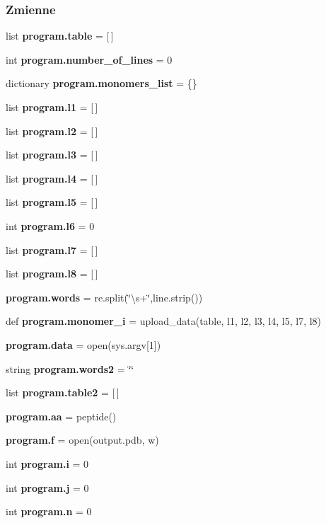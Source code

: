 \subsubsection*{Zmienne}
\begin{DoxyCompactItemize}
\item 
list \textbf{ program.\+table} = [$\,$]
\item 
int \textbf{ program.\+number\+\_\+of\+\_\+lines} = 0
\item 
dictionary \textbf{ program.\+monomers\+\_\+list} = \{\}
\item 
list \textbf{ program.\+l1} = [$\,$]
\item 
list \textbf{ program.\+l2} = [$\,$]
\item 
list \textbf{ program.\+l3} = [$\,$]
\item 
list \textbf{ program.\+l4} = [$\,$]
\item 
list \textbf{ program.\+l5} = [$\,$]
\item 
int \textbf{ program.\+l6} = 0
\item 
list \textbf{ program.\+l7} = [$\,$]
\item 
list \textbf{ program.\+l8} = [$\,$]
\item 
\textbf{ program.\+words} = re.\+split(\char`\"{}\textbackslash{}s+\char`\"{},line.\+strip())
\item 
def \textbf{ program.\+monomer\+\_\+i} = upload\+\_\+data(table, l1, l2, l3, l4, l5, l7, l8)
\item 
\textbf{ program.\+data} = open(sys.\+argv[1])
\item 
string \textbf{ program.\+words2} = \char`\"{}\char`\"{}
\item 
list \textbf{ program.\+table2} = [$\,$]
\item 
\textbf{ program.\+aa} = peptide()
\item 
\textbf{ program.\+f} = open(\textquotesingle{}output.\+pdb\textquotesingle{}, \textquotesingle{}w\textquotesingle{})
\item 
int \textbf{ program.\+i} = 0
\item 
int \textbf{ program.\+j} = 0
\item 
int \textbf{ program.\+n} = 0
\end{DoxyCompactItemize}
